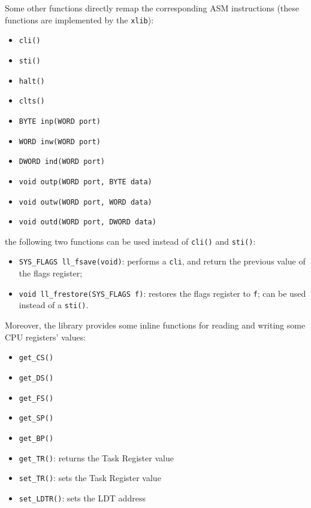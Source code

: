 \documentclass[a4paper]{report}
\begin{document}


Some other functions directly remap the corresponding ASM
instructions (these functions are implemented by the {\tt xlib}):
\begin{itemize}
\item {\tt cli()}
\item {\tt sti()}
\item {\tt halt()}
\item {\tt clts()}
\item {\tt BYTE inp(WORD port)}
\item {\tt WORD inw(WORD port)}
\item {\tt DWORD ind(WORD port)}
\item {\tt void outp(WORD port, BYTE data)}
\item {\tt void outw(WORD port, WORD data)}
\item {\tt void outd(WORD port, DWORD data)}
\end{itemize}
the following two functions can be used instead of {\tt cli()} and
{\tt sti()}:
\begin{itemize}
\item {\tt SYS\_FLAGS ll\_fsave(void)}: performs a {\tt cli}, and return the
		previous value of the flags register;
\item {\tt void ll\_frestore(SYS\_FLAGS f)}: restores the flags register to
		{\tt f}; can be used instead of a {\tt sti()}.
\end{itemize}

Moreover, the library provides some inline functions for reading and
writing some CPU registers' values:
\begin{itemize}
	\item {\tt get\_CS()}
	\item {\tt get\_DS()}
	\item {\tt get\_FS()}
	\item {\tt get\_SP()}
	\item {\tt get\_BP()}
	\item {\tt get\_TR()}: returns the Task Register value
	\item {\tt set\_TR()}: sets the Task Register value
	\item {\tt set\_LDTR()}: sets the LDT address
\end{itemize}
\end{document}
